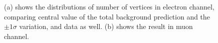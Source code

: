 \begin{figure}[hbtp]
  \centering
  \hspace{0.5cm}
  \caption{\label{fig:SYS_PU}(a) shows the distributions of number of vertices in electron channel, comparing central value of the total background prediction and the $\pm1\sigma$ variation, and data as well. (b) shows the result in muon channel.}
\end{figure}
